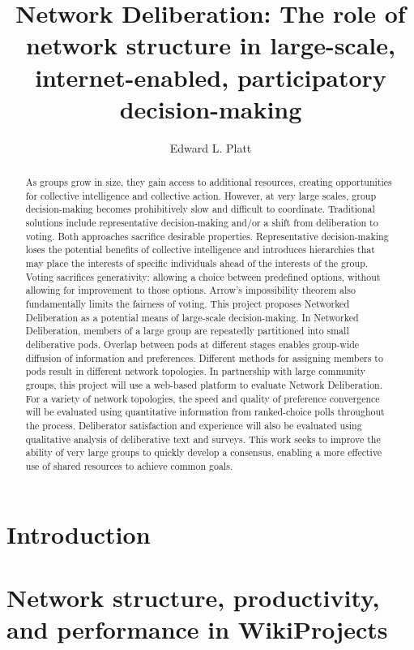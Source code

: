 \documentclass{report}
\author{Edward L. Platt}
\title{Network Deliberation: The role of network structure in large-scale, internet-enabled, participatory decision-making}
\newcommand{\+}{\phantom{-}}
\begin{document}
\maketitle

\begin{abstract}
As groups grow in size, they gain access to additional resources,
creating opportunities for collective intelligence and collective action.
However, at very large scales, group decision-making becomes prohibitively slow and difficult
to coordinate.
Traditional solutions include representative decision-making and/or a shift from deliberation
to voting.
Both approaches sacrifice desirable properties.
Representative decision-making loses the potential benefits of collective intelligence and
introduces hierarchies that may place the interests of specific individuals ahead of the
interests of the group.
Voting sacrifices generativity: allowing a choice between predefined options,
without allowing for improvement to those options.
Arrow’s impossibility theorem also fundamentally limits the fairness of voting.
This project proposes Networked Deliberation as a potential means of large-scale decision-making.
In Networked Deliberation, members of a large group are repeatedly partitioned into small
deliberative pods.
Overlap between pods at different stages enables group-wide diffusion of information and
preferences.
Different methods for assigning members to pods result in different network topologies.
In partnership with large community groups, this project will use a web-based platform to
evaluate Network Deliberation.
For a variety of network topologies, the speed and quality of preference convergence will be
evaluated using quantitative information from ranked-choice polls throughout the process.
Deliberator satisfaction and experience will also be evaluated using qualitative analysis of
deliberative text and surveys.
This work seeks to improve the ability of very large groups to quickly develop a consensus,
enabling a more effective use of shared resources to achieve common goals.
\end{abstract}

\tableofcontents

\chapter{Introduction}


\chapter{Network structure, productivity, and performance in WikiProjects}

\end{document}
